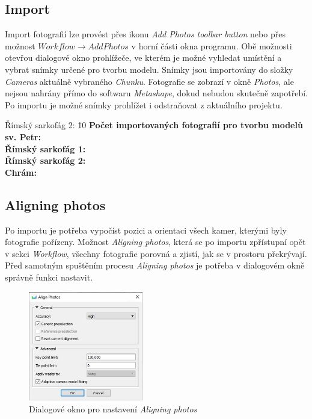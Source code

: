 \documentclass[a4paper, 12pt]{report}
\begin{document}
\subsection{Import}
Import fotografií lze provést přes ikonu \textit{Add Photos toolbar button} nebo přes možnost $Workflow \rightarrow Add Photos$ v horní části okna programu. Obě možnosti otevřou dialogové okno prohlížeče, ve kterém je možné vyhledat umístění a vybrat snímky určené pro tvorbu modelu. Snímky jsou importovány do složky \textit{Cameras} aktuálně vybraného \textit{Chunku}. Fotografie se zobrazí v okně \textit{Photos}, ale nejsou nahrány přímo do softwaru \textit{Metashape}, dokud nebudou skutečně zapotřebí. Po importu je možné snímky prohlížet i odstraňovat z aktuálního projektu. 

\begin{tabbing}
    Římský sarkofág 2:  \=      
    \= 10 \kill
    \bfseries Počet importovaných fotografií pro tvorbu modelů\> \\[1mm]
    sv. Petr:	\\
    Římský sarkofág 1:	\\
    Římský sarkofág 2:	\\
    Chrám:	\\
\end{tabbing}

\subsection{Aligning photos}
Po importu je potřeba vypočíst pozici a orientaci všech kamer, kterými byly fotografie pořízeny. Možnost \textit{Aligning photos}, která se po importu zpřístupní opět v sekci \textit{Workflow}, všechny fotografie porovná a zjistí, jak se v prostoru překrývají. Před samotným spuštěním procesu \textit{Aligning photos} je potřeba v dialogovém okně správně funkci nastavit. 

\begin{figure}[h!]
	\centering
	\includegraphics[width=5cm]{align.jpg}
	\caption{Dialogové okno pro nastavení \textit{Aligning photos}}
\end{figure}
\end{document}
